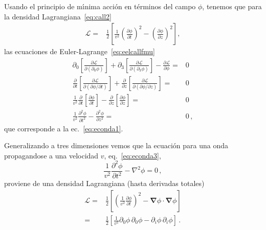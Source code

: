 Usando el principio de m\'\i nima acci\'on en t\'erminos del campo $\phi$, tenemos que para la densidad Lagrangiana~\eqref{eq:call2}
\begin{align}
  \mathcal{L}=&\frac{1}{2}  \left[
  \frac{1}{v^2}\left(\frac{\partial\phi}{\partial t}\right)^2-\left(\frac{\partial\phi}{\partial z}\right)^2
\right],
\end{align}
las ecuaciones de Euler-Lagrange~\eqref{eq:eelcallfmu}
\begin{align}
  \partial_0\left[\frac{\partial\mathcal{L}}{\partial(\partial_0\phi)}\right]+
\partial_3\left[\frac{\partial\mathcal{L}}{\partial(\partial_3\phi)}\right]
-\frac{\partial\mathcal{L}}{\partial\phi}=&0\nonumber\\
  \frac{\partial}{\partial t}\left[\frac{\partial\mathcal{L}}{\partial(\partial\phi/\partial t)}\right]+
\frac{\partial}{\partial z}\left[\frac{\partial\mathcal{L}}{\partial(\partial\phi/\partial z)}\right]
=&0\nonumber\\
 \frac{1}{v^2}\frac{\partial}{\partial t}\left[\frac{\partial\phi}{\partial t}\right]
-\frac{\partial}{\partial z}\left[\frac{\partial\phi}{\partial z}\right]=&0\nonumber\\
 \frac{1}{v^2}\frac{\partial^2\phi}{\partial t^2}-\frac{\partial^2\phi}{\partial z^2}=&0\,,
\end{align}
que corresponde a la ec.~\eqref{eq:econda1}.

Generalizando a tres dimensiones vemos que la ecuaci\'on para una onda propagandose a una velocidad $v$, eq.~\eqref{eq:econda3},  
\begin{equation}
     \frac{1}{v^2}\frac{\partial^2\phi}{\partial t^2}-\nabla^2\phi=0\,,
\end{equation}
proviene de una densidad Lagrangiana (hasta derivadas totales)
\begin{align}
    \mathcal{L}=&\frac{1}{2}\left[
  \left(
\frac{1}{v^2}\frac{\partial\phi}{\partial t}
  \right)^2-\boldsymbol{\nabla}\phi\cdot\boldsymbol{\nabla}\phi \right]\nonumber\\
    =&\frac{1}{2}\left[
      \frac{1}{v^2}{\partial_0\phi}\,{\partial_0\phi}-{\partial_i\phi}\,{\partial_i\phi}
   \right]\,.
\end{align}
